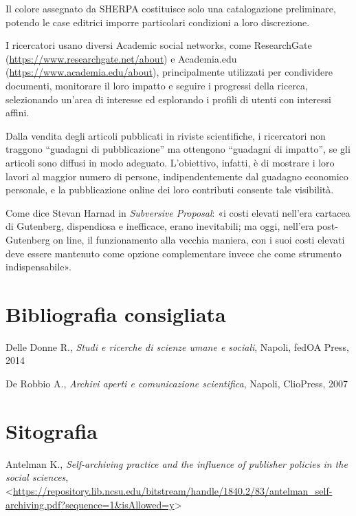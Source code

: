 \documentclass[
  b5paper,
  twoside,
  12pt,
  chapterprefix=false,
  bibliography=totocnumbered,
  parskip=false]{scrbook}
\begin{document}
Il colore assegnato da SHERPA costituisce solo una catalogazione
preliminare, potendo le case editrici imporre particolari condizioni a
loro discrezione.

I ricercatori usano diversi Academic social networks, come ResearchGate
(\href{https://www.researchgate.net/about}{{https://www.researchgate.net/about}})
e Academia.edu
(\href{https://www.academia.edu/about}{{https://www.academia.edu/about}}),
principalmente utilizzati per condividere documenti, monitorare il loro
impatto e seguire i progressi della ricerca, selezionando un'area di
interesse ed esplorando i profili di utenti con interessi affini.

Dalla vendita degli articoli pubblicati in riviste scientifiche, i
ricercatori non traggono \enquote{guadagni di pubblicazione} ma ottengono
\enquote{guadagni di impatto}, se gli articoli sono diffusi in modo adeguato.
L'obiettivo, infatti, è di mostrare i loro lavori al maggior numero di
persone, indipendentemente dal guadagno economico personale, e la
pubblicazione online dei loro contributi consente tale visibilità.

Come dice Stevan Harnad in \emph{Subversive} \emph{Proposal}: «i costi elevati
nell'era cartacea di Gutenberg, dispendiosa e inefficace, erano
inevitabili; ma oggi, nell'era post-Gutenberg on line, il funzionamento
alla vecchia maniera, con i suoi costi elevati deve essere mantenuto
come opzione complementare invece che come strumento indispensabile».

\hypertarget{bibliografia-consigliata-22}{%
\section*{Bibliografia consigliata}\label{bibliografia-consigliata-22}}

Delle Donne R., \emph{Studi e ricerche di scienze umane e sociali}, Napoli,
fedOA Press, 2014

De Robbio A., \emph{Archivi aperti e comunicazione scientifica}, Napoli,
ClioPress, 2007

\hypertarget{sitografia-28}{%
\section*{Sitografia}\label{sitografia-28}}

Antelman K., \emph{Self-archiving practice and the influence of publisher
policies in the social sciences},
\textless{}\href{https://repository.lib.ncsu.edu/bitstream/handle/1840.2/83/antelman_self-archiving.pdf?sequence=1\&isAllowed=y}{{https://repository.lib.ncsu.edu/bitstream/handle/1840.2/83/antelman\_self-archiving.pdf?sequence=1\&isAllowed=y}}\textgreater{}
\end{document}
